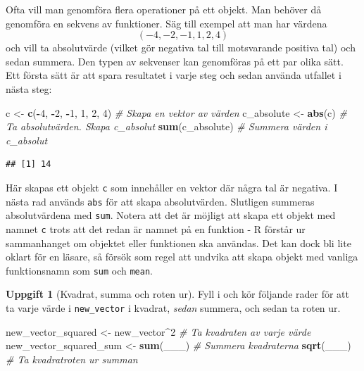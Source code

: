 \documentclass[
]{book}
\newenvironment{Shaded}{\begin{snugshade}}{\end{snugshade}}
\newcommand{\CommentTok}[1]{\textcolor[rgb]{0.56,0.35,0.01}{\textit{#1}}}
\newcommand{\DecValTok}[1]{\textcolor[rgb]{0.00,0.00,0.81}{#1}}
\newcommand{\FunctionTok}[1]{\textcolor[rgb]{0.13,0.29,0.53}{\textbf{#1}}}
\newcommand{\NormalTok}[1]{#1}
\newcommand{\OtherTok}[1]{\textcolor[rgb]{0.56,0.35,0.01}{#1}}
\newcommand{\SpecialCharTok}[1]{\textcolor[rgb]{0.81,0.36,0.00}{\textbf{#1}}}
\theoremstyle{definition}
\theoremstyle{definition}
\theoremstyle{definition}
\newtheorem{exercise}{Uppgift}[chapter]
\theoremstyle{definition}
\theoremstyle{remark}
\begin{document}
Ofta vill man genomföra flera operationer på ett objekt. Man behöver då genomföra en sekvens av funktioner. Säg till exempel att man har värdena \[(-4, -2, -1, 1, 2, 4)\] och vill ta absolutvärde (vilket gör negativa tal till motsvarande positiva tal) och sedan summera.
Den typen av sekvenser kan genomföras på ett par olika sätt. Ett första sätt är att spara resultatet i varje steg och sedan använda utfallet i nästa steg:

\begin{Shaded}
\begin{Highlighting}[]
\NormalTok{c }\OtherTok{\textless{}{-}} \FunctionTok{c}\NormalTok{(}\SpecialCharTok{{-}}\DecValTok{4}\NormalTok{, }\SpecialCharTok{{-}}\DecValTok{2}\NormalTok{, }\SpecialCharTok{{-}}\DecValTok{1}\NormalTok{, }\DecValTok{1}\NormalTok{, }\DecValTok{2}\NormalTok{, }\DecValTok{4}\NormalTok{)   }\CommentTok{\# Skapa en vektor av värden}
\NormalTok{c\_absolute }\OtherTok{\textless{}{-}} \FunctionTok{abs}\NormalTok{(c)          }\CommentTok{\# Ta absolutvärden. Skapa c\_absolut}
\FunctionTok{sum}\NormalTok{(c\_absolute)               }\CommentTok{\# Summera värden i c\_absolut}
\end{Highlighting}
\end{Shaded}

\begin{verbatim}
## [1] 14
\end{verbatim}

Här skapas ett objekt \texttt{c} som innehåller en vektor där några tal är negativa. I nästa rad används \texttt{abs} för att skapa absolutvärden. Slutligen summeras absolutvärdena med \texttt{sum}.
Notera att det är möjligt att skapa ett objekt med namnet \texttt{c} trots att det redan är namnet på en funktion - R förstår ur sammanhanget om objektet eller funktionen ska användas. Det kan dock bli lite oklart för en läsare, så försök som regel att undvika att skapa objekt med vanliga funktionsnamn som \texttt{sum} och \texttt{mean}.

\begin{exercise}[Kvadrat, summa och roten ur]

Fyll i och kör följande rader för att ta varje värde i \texttt{new\_vector} i kvadrat, \emph{sedan} summera, och sedan ta roten ur.

\begin{Shaded}
\begin{Highlighting}[]
\NormalTok{new\_vector\_squared }\OtherTok{\textless{}{-}}\NormalTok{ new\_vector}\SpecialCharTok{\^{}}\DecValTok{2} \CommentTok{\# Ta kvadraten av varje värde}
\NormalTok{new\_vector\_squared\_sum }\OtherTok{\textless{}{-}} \FunctionTok{sum}\NormalTok{(\_\_\_) }\CommentTok{\# Summera kvadraterna}
\FunctionTok{sqrt}\NormalTok{(\_\_\_)                          }\CommentTok{\# Ta kvadratroten ur summan}
\end{Highlighting}
\end{Shaded}

\end{exercise}
\end{document}
